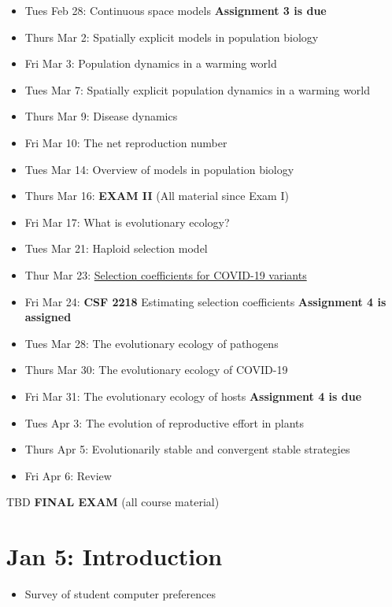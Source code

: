 \documentclass[
]{book}
\providecommand{\tightlist}{%
  \setlength{\itemsep}{0pt}\setlength{\parskip}{0pt}}
\begin{document}
\begin{itemize}
\tightlist
\item
  Tues Feb 28: Continuous space models \textbf{Assignment 3 is due}
\item
  Thurs Mar 2: Spatially explicit models in population biology
\item
  Fri Mar 3: Population dynamics in a warming world
\item
  Tues Mar 7: Spatially explicit population dynamics in a warming world
\item
  Thurs Mar 9: Disease dynamics
\item
  Fri Mar 10: The net reproduction number
\item
  Tues Mar 14: Overview of models in population biology
\item
  Thurs Mar 16: \textbf{EXAM II} (All material since Exam I)
\item
  Fri Mar 17: What is evolutionary ecology?
\item
  Tues Mar 21: Haploid selection model
\item
  Thur Mar 23: \href{https://www.zoology.ubc.ca/~otto/Talks/SSE2022_Otto.pdf}{Selection coefficients for COVID-19 variants}
\item
  Fri Mar 24: \textbf{CSF 2218} Estimating selection coefficients \textbf{Assignment 4 is assigned}
\item
  Tues Mar 28: The evolutionary ecology of pathogens
\item
  Thurs Mar 30: The evolutionary ecology of COVID-19
\item
  Fri Mar 31: The evolutionary ecology of hosts \textbf{Assignment 4 is due}
\item
  Tues Apr 3: The evolution of reproductive effort in plants
\item
  Thurs Apr 5: Evolutionarily stable and convergent stable strategies
\item
  Fri Apr 6: Review
\end{itemize}

TBD \textbf{FINAL EXAM} (all course material)

\hypertarget{jan-5-introduction}{%
\chapter{Jan 5: Introduction}\label{jan-5-introduction}}

\begin{itemize}
\tightlist
\item
  Survey of student computer preferences
\end{itemize}
\end{document}
